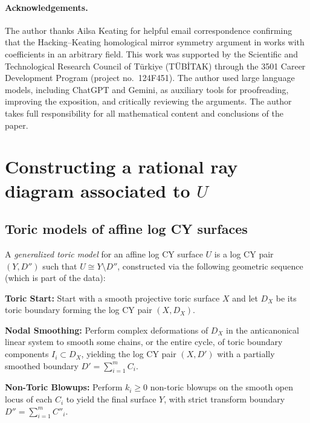 \documentclass[11pt, reqno]{amsart}
\theoremstyle{definition}
\begin{document}
\paragraph{\textbf{Acknowledgements.}} The author thanks Ailsa Keating for helpful email correspondence confirming that the Hacking--Keating homological mirror symmetry argument in \cite{HK22} works with coefficients in an arbitrary field. This work was supported by the Scientific and Technological Research Council of Türkiye (TÜBİTAK) through the 3501 Career Development Program (project no.\ 124F451). The author used large language models, including ChatGPT and Gemini, as auxiliary tools for proofreading, improving the exposition, and critically reviewing the arguments. The author takes full responsibility for all mathematical content and conclusions of the paper.


\section{Constructing a rational ray diagram associated to $U$}\label{sec2}





\subsection{Toric models of affine log CY surfaces}\label{sec-toric-model}

A \emph{generalized toric model} for an affine log CY surface $U$ is a log CY pair $(Y, D'')$ such that $U \cong Y \setminus D''$, constructed via the following geometric sequence (which is part of the data):



\textbf{Toric Start:} Start with a smooth projective toric surface $X$ and let $D_X$ be its toric boundary forming the log CY pair $(X, D_X)$.



\textbf{Nodal Smoothing:} Perform complex deformations of $D_X$ in the anticanonical linear system to smooth some chains, or the entire cycle, of toric boundary components $I_i \subset D_X$, yielding the log CY pair $(X,D')$ with a partially smoothed boundary $D' = \sum_{i=1}^m C_i$.



\textbf{Non-Toric Blowups:} Perform $k_i \ge 0$ non-toric blowups on the smooth open locus of each $C_i$ to yield the final surface $Y$, with strict transform boundary $D'' = \sum_{i=1}^m C''_i$.
\end{document}
